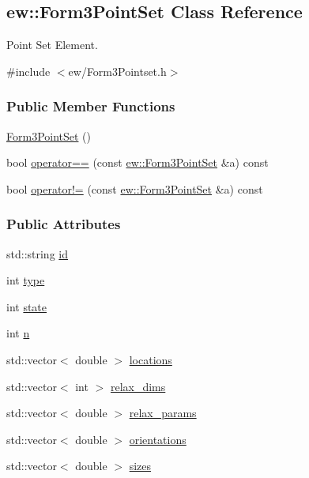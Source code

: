 \hypertarget{classew_1_1Form3PointSet}{
\subsection{ew::Form3PointSet Class Reference}
\label{classew_1_1Form3PointSet}
}


Point Set Element.  




{\ttfamily \#include $<$ew/Form3Pointset.h$>$}

\subsubsection*{Public Member Functions}
\begin{DoxyCompactItemize}
\item 
\hyperlink{classew_1_1Form3PointSet_af82da49edac230db378b50614e729da1}{Form3PointSet} ()
\item 
bool \hyperlink{classew_1_1Form3PointSet_a20ee108731a63191b3f50bc400365cdf}{operator==} (const \hyperlink{classew_1_1Form3PointSet}{ew::Form3PointSet} \&a) const 
\item 
bool \hyperlink{classew_1_1Form3PointSet_af6864af23bc5ac7ce23f4870f5716df5}{operator!=} (const \hyperlink{classew_1_1Form3PointSet}{ew::Form3PointSet} \&a) const 
\end{DoxyCompactItemize}
\subsubsection*{Public Attributes}
\begin{DoxyCompactItemize}
\item 
std::string \hyperlink{classew_1_1Form3PointSet_ac0dbd3aacae1fb9347d71880ea37f55c}{id}
\item 
int \hyperlink{classew_1_1Form3PointSet_ada976df73c605ebb9a845a915531a566}{type}
\item 
int \hyperlink{classew_1_1Form3PointSet_a1e020b47b7a87202ef42362843794f7f}{state}
\item 
int \hyperlink{classew_1_1Form3PointSet_a5bebf378e3fa2c68be2c002e216e9302}{n}
\item 
std::vector$<$ double $>$ \hyperlink{classew_1_1Form3PointSet_a809a22134ac1c040f41aaeee77478d34}{locations}
\item 
std::vector$<$ int $>$ \hyperlink{classew_1_1Form3PointSet_adc4dcbefde6d9c035548e5fe2ebe1ec7}{relax\_\-dims}
\item 
std::vector$<$ double $>$ \hyperlink{classew_1_1Form3PointSet_afd8ff3e67234c11b1ad3c66f1cccfb67}{relax\_\-params}
\item 
std::vector$<$ double $>$ \hyperlink{classew_1_1Form3PointSet_a48ab1e4e6d0b2a057bd6e2987c6cc488}{orientations}
\item 
std::vector$<$ double $>$ \hyperlink{classew_1_1Form3PointSet_abd3dfbeb887d147a08354761d5986920}{sizes}
\end{DoxyCompactItemize}


